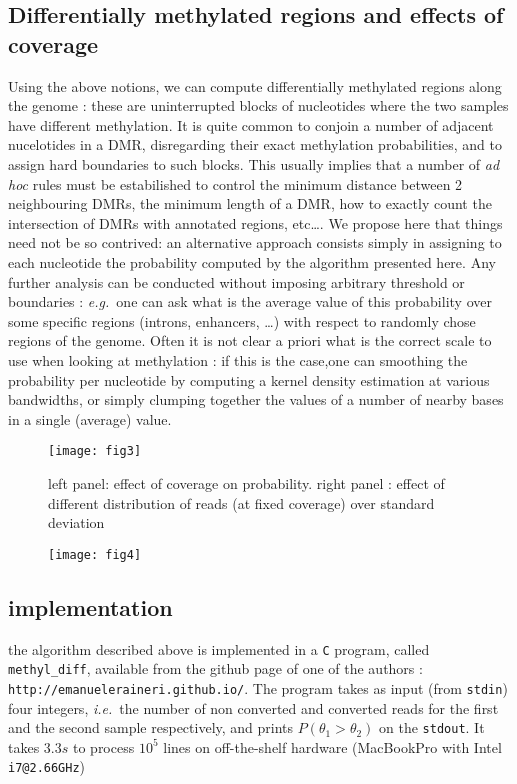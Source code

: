 \documentclass[11pt]{amsart}
\newcommand{\ie}{\textit{i.e.}\ }
\newcommand{\eg}{\textit{e.g.}\ }
\begin{document}
\subsection{Differentially methylated regions and effects of coverage}
Using the above notions, we can compute differentially methylated regions along the genome : these are uninterrupted blocks of nucleotides where the two samples have different methylation.
It is quite common to conjoin a number of adjacent nucelotides in a DMR, disregarding their exact methylation probabilities, and to assign hard boundaries to such blocks. This usually implies that a number of \textit{ad hoc} rules must be estabilished to control the minimum distance between 2 neighbouring DMRs, the minimum length of a DMR, how to exactly count the intersection of DMRs with annotated regions, etc\dots. We propose here that things need not be so contrived: an alternative approach consists simply in assigning to each nucleotide the probability computed by the algorithm presented here. Any further analysis can be conducted without imposing arbitrary threshold or boundaries : \eg one can ask what is the average value of this probability over some specific regions (introns, enhancers, \dots) with respect to randomly chose regions of the genome. Often it is not clear a priori what is the correct scale to use when looking at methylation : if this is the case,one can smoothing the probability per nucleotide by computing a kernel density estimation at various bandwidths, or simply clumping together the values of a number of nearby bases in a single (average) value. 
\begin{figure}[h]
\caption{left panel: effect of coverage on probability. right panel : effect of 
different distribution of reads (at fixed coverage) over standard deviation}
\texttt{[image: fig3]}
\label{pvalues}
\end{figure}
\begin{figure}[h]
\caption{}
\texttt{[image: fig4]}
\label{cov}
\end{figure}

\subsection{implementation}
the algorithm described above is implemented in a \verb=C= program, called \verb=methyl_diff=, available from the github page of one of the authors : \verb=http://emanueleraineri.github.io/=. The program takes as input (from \verb=stdin=) four integers, \ie the number of non converted and converted reads for the first and the second sample respectively, and prints $P(\theta_1>\theta_2)$ on the \verb=stdout=. It takes $3.3s$ to process $10^5$ lines on off-the-shelf hardware (MacBookPro with Intel \verb=i7@2.66GHz=) 


\end{document}

